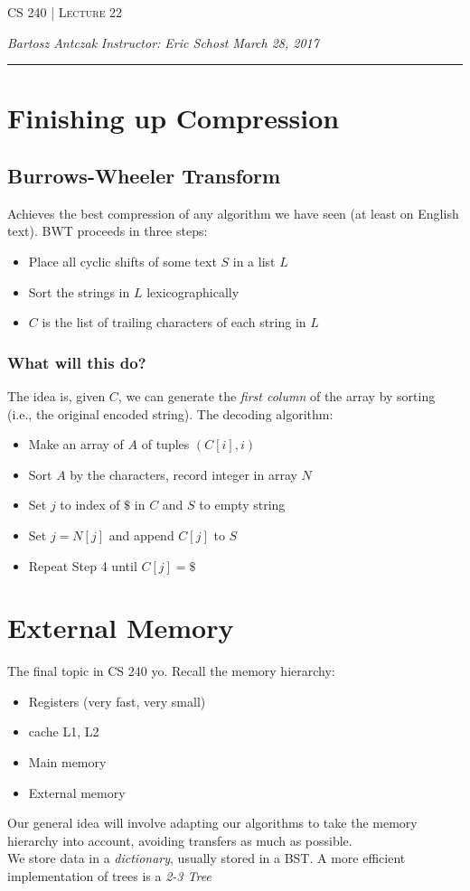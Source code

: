 \documentclass{report}
\newcommand{\lectureNum}{22}
\newcommand{\curDate}{March 28, 2017}
\newcommand{\course}{CS 240}
\begin{document}
\begin{center}
\begin{Large}
\textsc{\course{} | Lecture \lectureNum{}}
\end{Large}
\end{center} 
\noindent \textit{Bartosz Antczak} \hfill
\textit{Instructor: Eric Schost} \hfill
\textit{\curDate{}}
\rule{\textwidth}{0.4pt}
\section{Finishing up Compression}
\subsection{Burrows-Wheeler Transform}
Achieves the best compression of any algorithm we have seen (at least on English text). BWT proceeds in three steps:
\begin{itemize}
\item Place all cyclic shifts of some text $S$ in a list $L$
\item Sort the strings in $L$ lexicographically
\item $C$ is the list of trailing characters of each string in $L$
\end{itemize}
\subsubsection{What will this do?}
The idea is, given $C$, we can generate the \textit{first column} of the array by sorting (i.e., the original encoded string). The decoding algorithm:
\begin{itemize}
\item Make an array of $A$ of tuples $(C[i], i)$
\item Sort $A$ by the characters, record integer in array $N$
\item Set $j$ to index of $\$$ in $C$ and $S$ to empty string
\item Set $j = N[j]$ and append $C[j]$ to $S$
\item Repeat Step 4 until $C[j] = \$$
\end{itemize}
\section{External Memory}
The final topic in CS 240 yo. Recall the memory hierarchy:
\begin{itemize}
\item Registers (very fast, very small)
\item cache L1, L2
\item Main memory
\item External memory
\end{itemize}
Our general idea will involve adapting our algorithms to take the memory hierarchy into account, avoiding transfers as much as possible.\\
We store data in a \textit{dictionary}, usually stored in a BST. A more efficient implementation of trees is a \textit{2-3 Tree}
\end{document}
